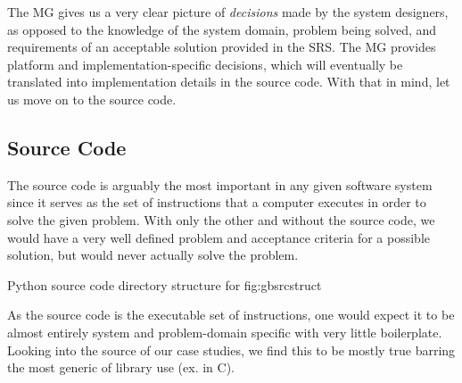 The MG gives us a very clear picture of \textit{decisions} made by the system 
designers, as opposed to the knowledge of the system domain, problem being 
solved, and requirements of an acceptable solution provided in the SRS. The MG 
provides platform and implementation-specific decisions, which will eventually 
be translated into implementation details in the source code. With that in 
mind, let us move on to the source code.

\subsection{Source Code}
\label{sec:breakdown:code}

The source code is arguably the most important \sf{} in any given software 
system since it serves as the set of instructions that a computer executes in 
order to solve the given problem. With only the other \sfs{} and without the 
source code, we would have a very well defined problem and acceptance criteria 
for a possible solution, but would never actually solve the problem.

{Python source code directory structure for \gb{}}
{fig:gbsrcstruct}

As the source code is the executable set of instructions, one would expect it 
to be almost entirely system and problem-domain specific with very little 
boilerplate. Looking into the source of our case studies, we find this to be 
mostly true barring the most generic of library use (ex. 
 in C).


